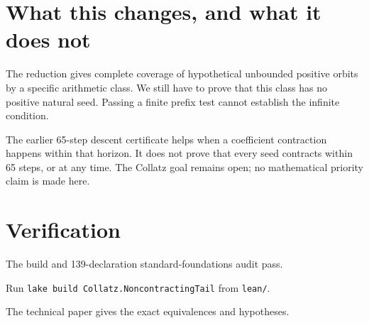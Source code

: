 \documentclass[10pt]{article}
\begin{document}
\section*{What this changes, and what it does not}
The reduction gives complete coverage of hypothetical unbounded positive
orbits by a specific arithmetic class. We still have to prove that this
class has no positive natural seed. Passing a finite prefix test cannot
establish the infinite condition.

The earlier 65-step descent certificate helps when a coefficient
contraction happens within that horizon. It does not prove that every
seed contracts within 65 steps, or at any time. The Collatz goal remains
open; no mathematical priority claim is made here.

\section*{Verification}
The build and 139-declaration standard-foundations audit pass.
{\raggedright Run \texttt{lake build Collatz.NoncontractingTail} from
\texttt{lean/}.\par}
The technical paper gives the exact equivalences and hypotheses.
\end{document}
